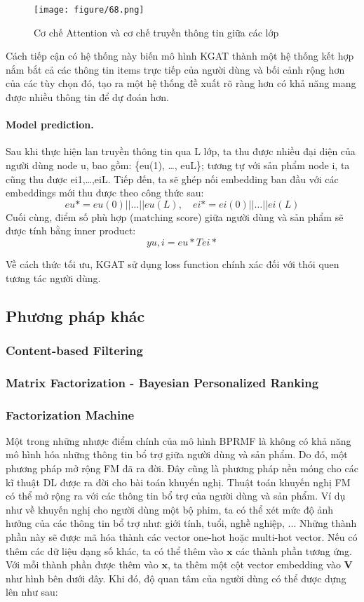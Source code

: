 \begin{figure}[h]
    \centering
    \texttt{[image: figure/68.png]}
    \caption{Cơ chế Attention và cơ chế truyền thông tin giữa các lớp}
    \label{fig:attention_process}
\end{figure}

Cách tiếp cận có hệ thống này biến mô hình KGAT thành một hệ thống kết hợp nắm bắt cả các thông tin items trực tiếp của người dùng và bối cảnh rộng hơn của các tùy chọn đó, tạo ra một hệ thống đề xuất rõ ràng hơn có khả năng mang được nhiều thông tin để dự đoán hơn.

\paragraph{Model prediction.}
Sau khi thực hiện lan truyền thông tin qua L lớp, ta thu được nhiều đại diện của người dùng node u, bao gồm: \{eu(1), …, euL\}; tương tự với sản phẩm node i, ta cũng thu được ei1,…,eiL. Tiếp đến, ta sẽ ghép nối embedding ban đầu với các embeddings mới thu được theo công thức sau:
\[
eu* = eu(0) || … || eu(L), \quad ei* = ei(0) || … || ei(L)
\]
Cuối cùng, điểm số phù hợp (matching score) giữa người dùng và sản phẩm sẽ được tính bằng inner product:
\[
yu,i = eu*T e i*
\]

Về cách thức tối ưu, KGAT sử dụng loss function chính xác đối với thói quen tương tác người dùng.



\subsection{Phương pháp khác}
\subsubsection{Content-based Filtering}
\subsubsection{Matrix Factorization - Bayesian Personalized Ranking}
\subsubsection{Factorization Machine}
Một trong những nhược điểm chính của mô hình BPRMF là không có khả năng mô hình hóa 
những thông tin bổ trợ giữa người dùng và sản phẩm. Do đó, một phương pháp mở rộng FM đã ra đời. 
Đây cũng là phương pháp nền móng cho các kĩ thuật DL được ra đời cho bài toán khuyến nghị.
\newline
\indent Thuật toán khuyến nghị FM có thể mở rộng ra với các thông tin bổ trợ của người dùng và sản phẩm. 
Ví dụ như về khuyến nghị cho người dùng một bộ phim, ta có thể xét mức độ ảnh hưởng của 
các thông tin bổ trợ như: giới tính, tuổi, nghề nghiệp, ... Những thành phần này sẽ được mã hóa 
thành các vector one-hot hoặc multi-hot vector. Nếu có thêm các dữ liệu dạng số khác, 
ta có thể thêm vào $\mathbf{x}$ các thành phần tương ứng. Với mỗi thành phần được thêm vào 
$\mathbf{x}$, ta thêm một cột vector embedding vào $\mathbf{V}$ như hình bên dưới đây.
Khi đó, độ quan tâm của người dùng có thể được dựng lên như sau:

